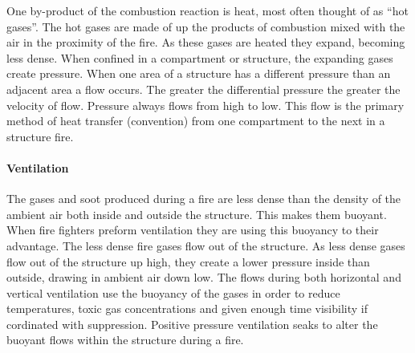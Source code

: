 \documentclass{article}
\begin{document}
One by-product of the combustion reaction is heat, most often thought of as ``hot gases''. The hot gases are made of up the products of combustion mixed with the air in the proximity of the fire. As these gases are heated they expand, becoming less dense. When confined in a compartment or structure, the expanding gases create pressure. When one area of a structure has a different pressure than an adjacent area a flow occurs. The greater the differential pressure the greater the velocity of flow. Pressure always flows from high to low. This flow is the primary method of heat transfer (convention) from one compartment to the next in a structure fire. 

\paragraph{Ventilation} \mbox{}

The gases and soot produced during a fire are less dense than the density of the ambient air both inside and outside the structure. This makes them buoyant. When fire fighters preform ventilation they are using this buoyancy to their advantage. The less dense fire gases flow out of the structure. As less dense gases flow out of the structure up high, they create a lower pressure inside than outside, drawing in ambient air down low. The flows during both horizontal and vertical ventilation use the buoyancy of the gases in order to reduce temperatures, toxic gas concentrations and given enough time visibility if cordinated with suppression. Positive pressure ventilation seaks to alter the buoyant flows within the structure during a fire. 
\end{document}
